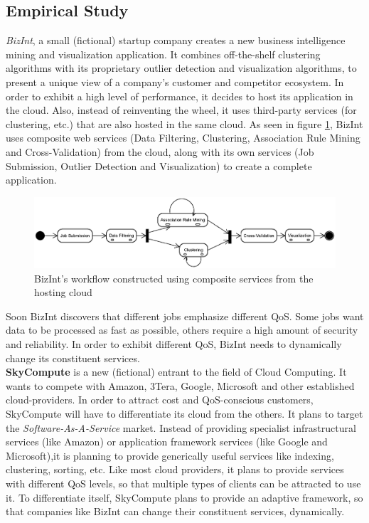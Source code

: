 \documentclass[10pt,journal,compsoc]{IEEEtran}
\begin{document}
\subsection{Empirical Study}
\textit{BizInt}, a small (fictional) startup company creates a new business intelligence mining and visualization application.  It combines off-the-shelf clustering algorithms with its proprietary outlier detection and visualization algorithms, to present a unique view of a company's customer and competitor ecosystem. In order to exhibit a high level of performance, it decides to host its application in the cloud. Also, instead of reinventing the wheel, it uses third-party services (for clustering, etc.) that are also hosted in the same cloud. As seen in figure \ref{fig:BizIntWorkflow}, BizInt uses composite web services (Data Filtering, Clustering, Association Rule Mining and Cross-Validation) from the cloud, along with its own services (Job Submission, Outlier Detection and Visualization) to create a complete application.
\begin{figure}%
\includegraphics[scale=0.4, clip, trim=0 20cm 0 4cm]{Figure6.eps}%
\caption{BizInt's workflow constructed using composite services from the hosting cloud\label{fig:BizIntWorkflow}}%
\end{figure}
Soon BizInt discovers that different jobs emphasize different QoS. Some jobs want data to be processed as fast as possible, others require a high amount of security and reliability. In order to exhibit different QoS, BizInt needs to dynamically change its constituent services. \\
\textbf{SkyCompute} is a new (fictional) entrant to the field of Cloud Computing. It wants to compete with Amazon, 3Tera, Google, Microsoft and other established cloud-providers. In order to attract cost and QoS-conscious customers, SkyCompute will have to differentiate its cloud from the others. It plans to target the \textit{Software-As-A-Service} market. Instead of providing specialist infrastructural services (like Amazon) or application framework services (like Google and Microsoft),it is planning to provide generically useful services like indexing, clustering, sorting, etc. Like most cloud providers, it plans to provide services with different QoS levels, so that multiple types of clients can be attracted to use it. To differentiate itself, SkyCompute plans to provide an adaptive framework, so that companies like BizInt can change their constituent services, dynamically.
\end{document}
